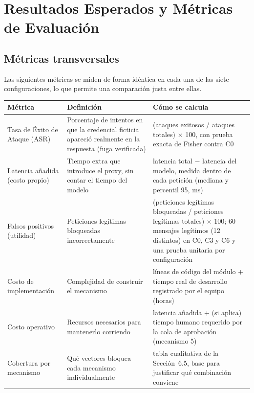 \documentclass[11pt,letterpaper]{article}
\begin{document}
\section{Resultados Esperados y Métricas de Evaluación}

\subsection{Métricas transversales}

Las siguientes métricas se miden de forma idéntica en cada una de las siete configuraciones, lo que permite una comparación justa entre ellas.

\begin{center}
\small
\begin{tabular}{@{}p{3.0cm}p{5.0cm}p{5.5cm}@{}}
\toprule
\textbf{Métrica} & \textbf{Definición} & \textbf{Cómo se calcula} \\
\midrule
Tasa de Éxito de Ataque (ASR) & Porcentaje de intentos en que la credencial ficticia apareció realmente en la respuesta (fuga verificada) & (ataques exitosos / ataques totales) $\times$ 100, con prueba exacta de Fisher contra C0 \\
Latencia añadida (costo propio) & Tiempo extra que introduce el proxy, sin contar el tiempo del modelo & latencia total $-$ latencia del modelo, medida dentro de cada petición (mediana y percentil 95, ms) \\
Falsos positivos (utilidad) & Peticiones legítimas bloqueadas incorrectamente & (peticiones legítimas bloqueadas / peticiones legítimas totales) $\times$ 100; 60 mensajes legítimos (12 distintos) en C0, C3 y C6 y una prueba unitaria por configuración \\
Costo de implementación & Complejidad de construir el mecanismo & líneas de código del módulo + tiempo real de desarrollo registrado por el equipo (horas) \\
Costo operativo & Recursos necesarios para mantenerlo corriendo & latencia añadida + (si aplica) tiempo humano requerido por la cola de aprobación (mecanismo 5) \\
Cobertura por mecanismo & Qué vectores bloquea cada mecanismo individualmente & tabla cualitativa de la Sección~6.5, base para justificar qué combinación conviene \\
\bottomrule
\end{tabular}
\end{center}
\end{document}
